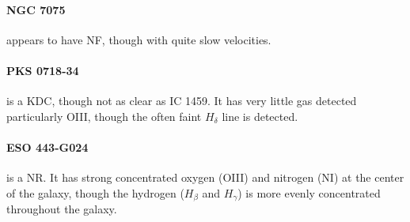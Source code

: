 \documentclass[a4paper,fleqn,usenatbib,useAMS]{mnras}
\begin{document}
	\paragraph{NGC 7075} appears to have NF, though with quite slow velocities.

	\paragraph{PKS 0718-34} is a KDC, though not as clear as IC 1459. It has very little gas detected particularly OIII, though the often faint $H_\delta$ line is detected. 

	\paragraph{ESO 443-G024} is a NR. It has strong concentrated oxygen (OIII) and nitrogen (NI) at the center of the galaxy, though the hydrogen ($H_\beta$ and $H_\gamma$) is more evenly concentrated throughout the galaxy.
\end{document}
